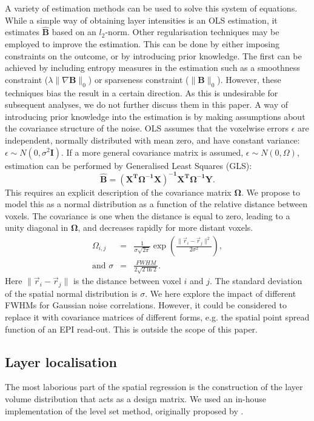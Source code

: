 A variety of estimation methods can be used to solve this system of equations. While a simple way of obtaining layer intensities is an OLS estimation, it estimates $\hat{\mathbf{B}}$ based on an $l_2$-norm. Other regularisation techniques may be employed to improve the estimation. This can be done by either imposing constraints on the outcome, or by introducing prior knowledge. The first can be achieved by including entropy measures in the estimation such as a smoothness constraint ($\lambda \| \nabla \mathbf{B} \|_0$) or sparseness constraint ($\| \mathbf{B} \|_0$). However, these techniques bias the result in a certain direction. As this is undesirable for subsequent analyses, we do not further discuss them in this paper. A way of introducing prior knowledge into the estimation is by making assumptions about the covariance structure of the noise. OLS assumes that the voxelwise errors $\epsilon$ are independent, normally distributed with mean zero, and have constant variance: $\epsilon \sim  N(0,\sigma^2 \mathbf{I})$. If a more general covariance matrix is assumed, $\epsilon \sim  N(0,\Omega)$, estimation can be performed by Generalised Least Squares (GLS): 
\begin{equation}
\mathbf{\hat{B}=\left(X^T \Omega^{-1}X\right)^{-1} X^T\Omega^{-1} Y}.
\end{equation}
This requires an explicit description of the covariance matrix $\mathbf{\Omega}$. We propose to model this as a normal distribution as a function of the relative distance between voxels. The covariance is one when the distance is equal to zero, leading to a unity diagonal in  $\mathbf{\Omega}$, and decreases rapidly for more distant voxels. 
\begin{eqnarray}
\Omega_{i,j}&=&
\frac{1}{\sigma\sqrt{2\pi}}
\exp\left(\frac{\|\vec{r}_i-\vec{r}_j\|^2}{2\sigma^2}\right),\nonumber \\
\text{and}\,\, \sigma&=&\frac{FWHM}{2\sqrt{2\ln{2}}}.
\end{eqnarray}
Here $\| \vec{r}_i - \vec{r}_j\|$ is the distance between voxel $i$ and $j$. The standard deviation of the spatial normal distribution is $\sigma$. We here explore the impact of different FWHMs for Gaussian noise correlations. However, it could be considered to replace it with covariance matrices of different forms, e.g. the spatial point spread function of an EPI read-out. This is outside the scope of this paper. 
  
\subsection{Layer localisation}
\label{subsec:LayerVolumeDist}
The most laborious part of the spatial regression is the construction of the layer volume distribution that acts as a design matrix. We used an in-house implementation of the level set method, originally proposed by \cite{Waehnert2014}.

